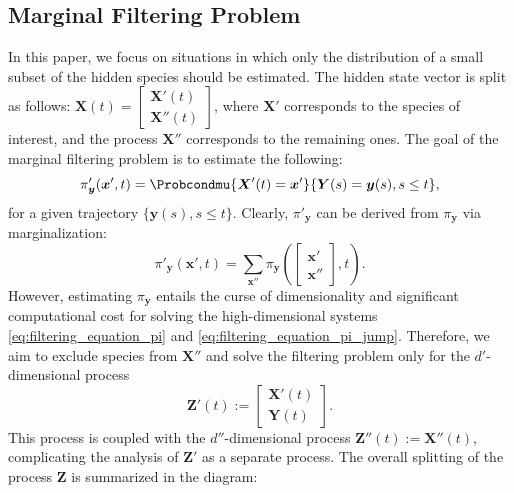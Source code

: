 \subsection{Marginal Filtering Problem}
\label{sec:margin_filtering_problem}

In this paper, we focus on situations in which only the distribution of a small subset of the hidden species should be estimated. The hidden state vector is split as follows: $ \boldsymbol{X}(t) = \begin{bmatrix} \boldsymbol{X}'(t) \\ \boldsymbol{X}''(t) \end{bmatrix} $, where $\boldsymbol{X}'$ corresponds to the species of interest, and the process $\boldsymbol{X}''$ corresponds to the remaining ones. The goal of the marginal filtering problem is to estimate the following:
\begin{equation}
\label{eq:filtering_problem_margin}
    \pi'_{\boldsymbol{y}} (\boldsymbol{x}', t) = \Probcondmu{\boldsymbol{X}'(t) = \boldsymbol{x}' }{ \boldsymbol{Y}(s) = \boldsymbol{y}(s), s \leq t },
\end{equation}
for a given trajectory $\{ \boldsymbol{y}(s), s \leq t \}$. Clearly,  $\pi'_{\boldsymbol{y}}$ can be derived from $\pi_{\boldsymbol{y}}$ via marginalization:
\begin{equation}
\nonumber    
    \pi'_{\boldsymbol{y}} ({\boldsymbol{x}'}, t) = \sum_{{\boldsymbol{x}''}} \pi_{\boldsymbol{y}} \left( \begin{bmatrix} \boldsymbol{x}' \\ \boldsymbol{x}'' \end{bmatrix}, t \right).
\end{equation}
However, estimating $\pi_{\boldsymbol{y}}$ entails the curse of dimensionality and significant computational cost for solving the high-dimensional systems \eqref{eq:filtering_equation_pi} and \eqref{eq:filtering_equation_pi_jump}. Therefore, we aim to exclude species from $\boldsymbol{X}''$ and solve the filtering problem only for the $d'$-dimensional process
$$
    \boldsymbol{Z}'(t) := 
    \begin{bmatrix}
        \boldsymbol{X}'(t) \\
        \boldsymbol{Y}(t)
    \end{bmatrix} .
$$
This process is coupled with the $d''$-dimensional process $\boldsymbol{Z}''(t) := \boldsymbol{X}''(t)$, complicating the analysis of $\boldsymbol{Z}'$ as a separate process. The overall splitting of the process $\boldsymbol{Z}$ is summarized in the diagram:

